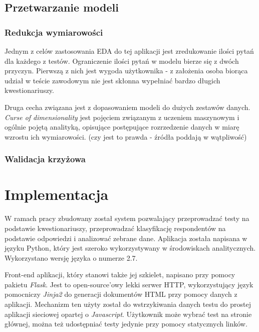 \documentclass[12pt,a4paper,oneside]{report} %
\begin{document}
\section{Przetwarzanie modeli}

\subsection{Redukcja wymiarowości}

Jednym z celów zastosowania EDA do tej aplikacji jest zredukowanie ilości pytań dla każdego z testów. Ograniczenie ilości pytań w modelu bierze się z dwóch przyczyn. Pierwszą z nich jest wygoda użytkownika - z założenia osoba biorąca udział w teście zawodowym nie jest skłonna wypełniać bardzo długich kwestionariuszy.

Druga cecha związana jest z dopasowaniem modeli do dużych zestawów danych. \emph{Curse of dimensionality} jest pojęciem związanym z uczeniem maszynowym i ogólnie pojętą analityką, opisujące postępujące rozrzedzenie danych w miarę wzrostu ich wymiarowości. (czy jest to prawda - źródła poddają w wątpliwość)

\subsection{Walidacja krzyżowa}






\chapter{Implementacja}

W ramach pracy zbudowany został system pozwalający przeprowadzać testy na podstawie kwestionariuszy, przeprowadzać klasyfikację respondentów na podstawie odpowiedzi i analizować zebrane dane. Aplikacja została napisana w języku Python, który jest szeroko wykorzystywany w środowiskach analitycznych. Wykorzystano wersję języka o numerze 2.7.

Front-end aplikacji, który stanowi także jej szkielet, napisano przy pomocy pakietu \emph{Flask}. Jest to open-source'owy lekki serwer HTTP, wykorzystujący język pomocniczy \emph{Jinja2} do generacji dokumentów HTML przy pomocy danych z aplikacji. Mechanizm ten użyty został do wstrzykiwania danych testu do prostej aplikacji sieciowej opartej o \emph{Javascript}. Użytkownik może wybrać test na stronie głównej, można też udostępniać testy jedynie przy pomocy statycznych linków.
\end{document}
